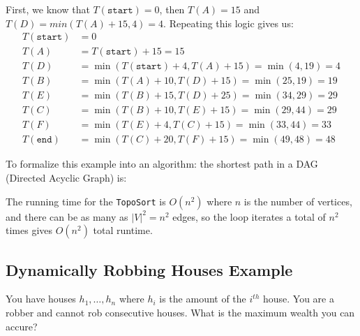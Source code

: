 \documentclass[14pt]{extarticle}
\begin{document}
    First, we know that $T(\texttt{start}) = 0$, then $T(A) = 15$ and
    $T(D) = min(T(A) + 15, 4) = 4$. Repeating this logic gives us:
    \begin{align*}
        T(\texttt{start})   &= 0                                \\
        T(A)                &= T(\texttt{start}) + 15 = 15      \\
        T(D)                &= \min(T(\texttt{start}) + 4, T(A) + 15) = 
                                \min(4, 19) = 4                 \\
        T(B)                &= \min(T(A) + 10, T(D) + 15) = \min(25, 19) = 19\\
        T(E)                &= \min(T(B) + 15, T(D) + 25) = \min(34, 29) = 29\\
        T(C)                &= \min(T(B) + 10, T(E) + 15) = \min(29, 44) = 29\\
        T(F)                &= \min(T(E) + 4, T(C) + 15) = \min(33, 44) = 33\\
        T(\texttt{end})     &= \min(T(C) + 20, T(F) + 15) = \min(49, 48) = 
                                \boxed{48}
    \end{align*}

    To formalize this example into an algorithm: the shortest path in a DAG
    (Directed Acyclic Graph) is:

    \begin{algorithm}[H]
    \end{algorithm}
    
    The running time for the \texttt{TopoSort} is $O(n^2)$ where $n$ is
    the number of vertices, and there can be as many as $|V|^2 = n^2$ edges,
    so the loop iterates a total of $n^2$ times gives $O(n^2)$ total runtime.

    \subsection*{Dynamically Robbing Houses Example}
    You have houses $h_1, \ldots, h_n$ where $h_i$ is the amount of the
    $i^{th}$ house. You are a robber and cannot rob consecutive houses.
    What is the maximum wealth you can accure?\\
\end{document}
